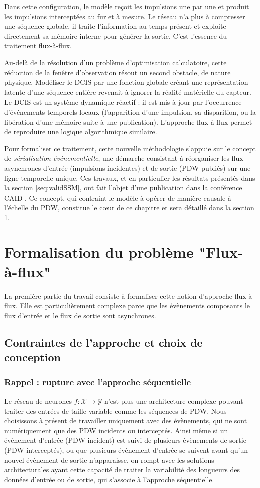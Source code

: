 Dans cette configuration, le modèle reçoit les impulsions une par une et produit les impulsions interceptées au fur et à mesure. Le réseau n'a plus à compresser une séquence globale, il traite l'information au temps présent et exploite directement sa mémoire interne pour générer la sortie. C'est l'essence du traitement flux-à-flux.

Au-delà de la résolution d'un problème d'optimisation calculatoire, cette réduction de la fenêtre d'observation résout un second obstacle, de nature physique. Modéliser le DCIS par une fonction globale créant une représentation latente d'une séquence entière revenait à ignorer la réalité matérielle du capteur. Le DCIS est un système dynamique réactif : il est mis à jour par l'occurrence d'événements temporels locaux (l'apparition d'une impulsion, sa disparition, ou la libération d'une mémoire suite à une publication). L'approche flux-à-flux permet de reproduire une logique algorithmique similaire.

Pour formaliser ce traitement, cette nouvelle méthodologie s'appuie sur le concept de \textit{sérialisation événementielle}, une démarche consistant à réorganiser les flux asynchrones d'entrée (impulsions incidentes) et de sortie (PDW publiés) sur une ligne temporelle unique. Ces travaux, et en particulier les résultats présentés dans la section \ref{seq:validSSM}, ont fait l'objet d'une publication dans la conférence CAID \cite{lagarde_surrogates_2025}. Ce concept, qui contraint le modèle à opérer de manière causale à l'échelle du PDW, constitue le cœur de ce chapitre et sera détaillé dans la section \ref{seq:serialisation}.


\section{Formalisation du problème "Flux-à-flux"}
\label{seq:serialisation}
La première partie du travail consiste à formaliser cette notion d'approche flux-à-flux. Elle est particulièrement complexe parce que les évènements composants le flux d'entrée et le flux de sortie sont asynchrones. 

\subsection{Contraintes de l'approche et choix de conception}
\subsubsection{Rappel : rupture avec l'approche séquentielle}
Le réseau de neurones $f: \mathcal{X} \to \mathcal{Y}$ n'est plus une architecture complexe pouvant traiter des entrées de taille variable comme les séquences de PDW. Nous choisissons à présent de travailler uniquement avec des évènements, qui ne sont numériquement que des PDW incidents ou interceptés. Ainsi même si un évènement d'entrée (PDW incident) est suivi de plusieurs évènements de sortie (PDW interceptés), ou que plusieurs évènement d'entrée se suivent avant qu'un nouvel évènement de sortie n'apparaisse, on rompt avec les solutions architecturales ayant cette capacité de traiter la variabilité des longueurs des données d'entrée ou de sortie, qui s'associe à l'approche séquentielle.

